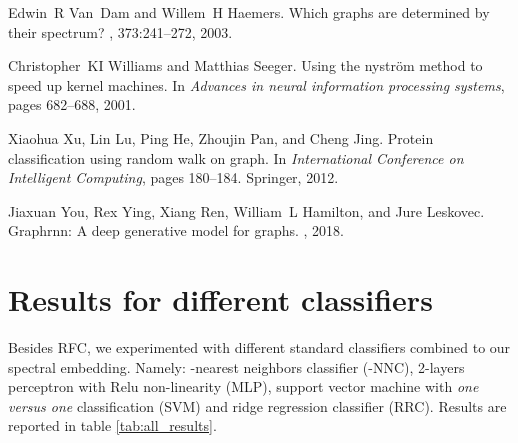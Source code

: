 \documentclass{article}
\begin{document}
\begin{thebibliography}{10}
Edwin~R Van~Dam and Willem~H Haemers.
\newblock Which graphs are determined by their spectrum?
, 373:241--272, 2003.

Christopher~KI Williams and Matthias Seeger.
\newblock Using the nystr{\"o}m method to speed up kernel machines.
\newblock In {\em Advances in neural information processing systems}, pages
  682--688, 2001.

Xiaohua Xu, Lin Lu, Ping He, Zhoujin Pan, and Cheng Jing.
\newblock Protein classification using random walk on graph.
\newblock In {\em International Conference on Intelligent Computing}, pages
  180--184. Springer, 2012.

Jiaxuan You, Rex Ying, Xiang Ren, William~L Hamilton, and Jure Leskovec.
\newblock Graphrnn: A deep generative model for graphs.
, 2018.

\end{thebibliography}

\clearpage
\appendix

\section{Results for different classifiers}
\label{app:all_results}

Besides RFC, we experimented with different standard classifiers combined to our spectral embedding. Namely: -nearest neighbors classifier (-NNC), 2-layers perceptron with Relu non-linearity (MLP), support vector machine with \textit{one versus one} classification (SVM) and ridge regression classifier (RRC). Results are reported in table \ref{tab:all_results}.
\end{document}
